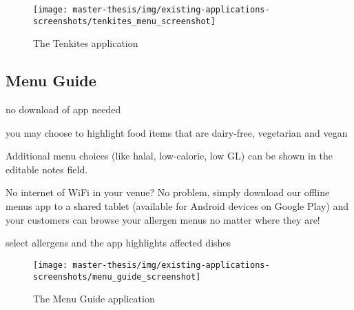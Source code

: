   \begin{figure}[h]
    \centering
    \texttt{[image: master-thesis/img/existing-applications-screenshots/tenkites\_menu\_screenshot]}
    \caption{The Tenkites application}
  \end{figure}

\subsection*{Menu Guide}
  no download of app needed

  you may choose to highlight food items that are dairy-free, vegetarian and vegan

  Additional menu choices (like halal, low-calorie, low GL) can be shown in the editable notes field.

  No internet of WiFi in your venue? No problem, simply download our offline menus app to a shared tablet (available for Android devices on Google Play) and your customers can browse your allergen menus no matter where they are!

  select allergens and the app highlights affected dishes

  \begin{figure}[h]
    \centering
    \texttt{[image: master-thesis/img/existing-applications-screenshots/menu\_guide\_screenshot]}
    \caption{The Menu Guide application}
  \end{figure}


